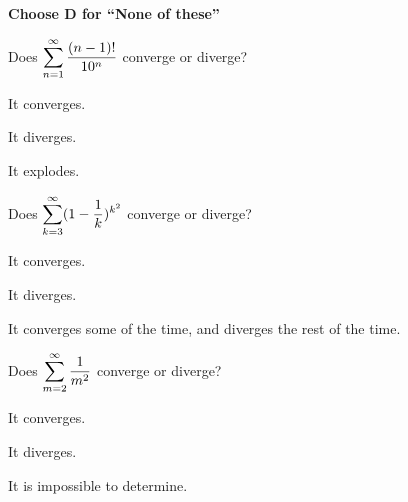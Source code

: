 \documentclass[12pt]{exam}
\newcommand{\ds}{\ensuremath{\displaystyle}}
\newcommand{\<}{\langle}
\renewcommand{\>}{\rangle}
\begin{document}
\begin{center}
\end{center}
\vspace{0.1in}

\vspace{12pt}

\textbf{Choose D for ``None of these''}

\begin{questions}\setcounter{question}{38}

\question
Does \(\ds\sum_{n=1}^\infty\frac{(n-1)!}{10^n}\) converge or
diverge?
\begin{choices}
\item It converges.
\item It diverges.
\item It explodes.
\end{choices}

\question
Does \(\ds\sum_{k=3}^\infty(1-\frac{1}{k})^{k^2}\) converge or
diverge?
\begin{choices}
\item It converges.
\item It diverges.
\item It converges some of the time, and diverges the rest of the time.
\end{choices}

\question
Does \(\ds\sum_{m=2}^\infty\frac{1}{m^2}\) converge or
diverge?
\begin{choices}
\item It converges.
\item It diverges.
\item It is impossible to determine.
\end{choices}

\end{questions}
\end{document}
